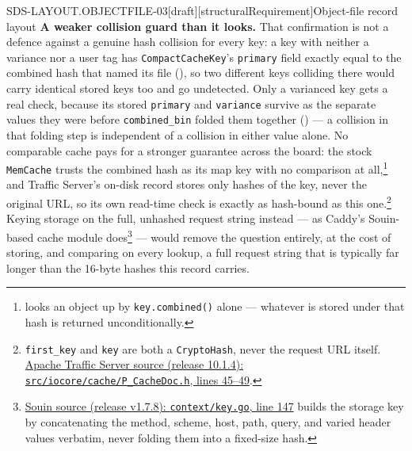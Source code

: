 \begin{requirement}{SDS-LAYOUT.OBJECTFILE-03}[draft][structuralRequirement]{Object-file record layout}
  \textbf{A weaker collision guard than it looks.} That confirmation is not
  a defence against a genuine hash collision for every key: a key with
  neither a variance nor a user tag has \texttt{CompactCacheKey}'s
  \texttt{primary} field exactly equal to the combined hash that named its
  file (), so two different keys
  colliding there would carry identical stored keys too and go undetected.
  Only a varianced key gets a real check, because its stored
  \texttt{primary} and \texttt{variance} survive as the separate values
  they were before \texttt{combined\_bin} folded them together
  () --- a collision in that folding step is
  independent of a collision in either value alone. No comparable cache
  pays for a stronger guarantee across the board: the stock
  \texttt{MemCache} trusts the combined hash as its map key with no
  comparison at
  all,\footnote{
  looks an object up by \texttt{key.combined()} alone --- whatever is
  stored under that hash is returned unconditionally.} and Traffic
  Server's on-disk record stores only hashes of the key, never the
  original URL, so its own read-time check is exactly as hash-bound as
  this one.\footnote{\texttt{first\_key} and \texttt{key} are both a
  \texttt{CryptoHash}, never the request URL itself.
  \href{https://github.com/apache/trafficserver/blob/10.1.4/src/iocore/cache/P_CacheDoc.h\#L45-L49}{Apache
  Traffic Server source (release 10.1.4):
  \texttt{src/iocore/cache/P\_CacheDoc.h}, lines 45--49}.} Keying storage
  on the full, unhashed request string instead --- as Caddy's Souin-based
  cache module does\footnote{\href{https://github.com/darkweak/souin/blob/v1.7.8/context/key.go\#L147}{Souin
  source (release v1.7.8): \texttt{context/key.go}, line 147} builds the
  storage key by concatenating the method, scheme, host, path, query, and
  varied header values verbatim, never folding them into a fixed-size
  hash.} --- would remove the question entirely, at the cost of storing,
  and comparing on every lookup, a full request string that is typically
  far longer than the 16-byte hashes this record carries.


\end{requirement}
